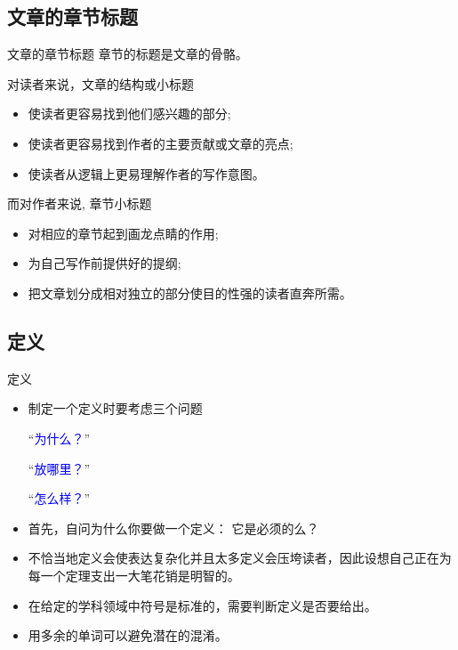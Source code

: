 \documentclass[13pt]{ctexbeamer}
\newcommand{\blue}[1]{\textcolor{blue}{#1}}
\begin{document}
	\setcounter{tocdepth}{2}
\frame{\tableofcontents[currentsection]}

\subsection{文章的章节标题}
\begin{frame}{文章的章节标题}
章节的标题是文章的骨骼。

对读者来说，文章的结构或小标题

\begin{itemize}
    \item  使读者更容易找到他们感兴趣的部分;
\item 使读者更容易找到作者的主要贡献或文章的亮点;
\item 使读者从逻辑上更易理解作者的写作意图。
\end{itemize}


而对作者来说, 章节小标题
\begin{itemize}
    \item  对相应的章节起到画龙点睛的作用;

\item 为自己写作前提供好的提纲;

\item 把文章划分成相对独立的部分使目的性强的读者直奔所需。
\end{itemize}
\end{frame}




\subsection{定义}
\begin{frame}{定义}
	\begin{itemize}
		\item
		制定一个定义时要考虑三个问题

		``\blue{为什么？}''

		``\blue{放哪里？}''

		``\blue{怎么样？}''
		\item
		首先，自问为什么你要做一个定义： 它是必须的么？
		\item
		不恰当地定义会使表达复杂化并且太多定义会压垮读者，因此设想自己正在为每一个定理支出一大笔花销是明智的。
		\item
		在给定的学科领域中符号是标准的，需要判断定义是否要给出。
		\item
		用多余的单词可以避免潜在的混淆。
	\end{itemize}
\end{frame}
\end{document}
